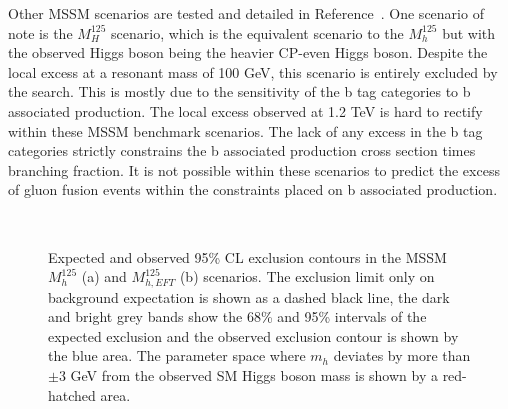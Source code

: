 Other \ac{MSSM} scenarios are tested and detailed in Reference~\cite{CMS:2022rbd}.
One scenario of note is the $M_{H}^{125}$ scenario, which is the equivalent scenario to the $M_{h}^{125}$ but with the observed Higgs boson being the heavier \ac{CP}-even Higgs boson.
Despite the local excess at a resonant mass of 100 GeV, this scenario is entirely excluded by the search. 
This is mostly due to the sensitivity of the b tag categories to b associated production.
The local excess observed at 1.2 TeV is hard to rectify within these \ac{MSSM} benchmark scenarios.
The lack of any excess in the b tag categories strictly constrains the b associated production cross section times branching fraction.
It is not possible within these scenarios to predict the excess of gluon fusion events within the constraints placed on b associated production. \\

\begin{figure}[!hbtp]
\centering
     \\
\caption{Expected and observed 95\% CL exclusion contours in the MSSM $M_{h}^{125}$ (a) and $M_{h,EFT}^{125}$ (b) scenarios. The exclusion limit only on background expectation is shown as a dashed black line, the dark and bright grey bands show the 68\% and 95\% intervals of the expected exclusion and the observed exclusion contour is shown by the blue area. The parameter space where $m_{h}$ deviates by more than $\pm$3  GeV from the observed SM Higgs boson mass is shown by a red-hatched area.~\cite{CMS:2022rbd}
}
\label{fig:mssm_limits}
\end{figure}

